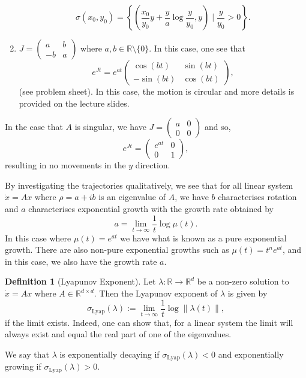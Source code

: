 \documentclass[
]{article}
\theoremstyle{definition}
\theoremstyle{definition}
\newtheorem{definition}{Definition}[section]
\begin{document}
\begin{enumerate}
  \[\sigma(x_0, y_0) = \left\{
    \left(\frac{x_0}{y_0}y + \frac{y}{a}\log\frac{y}{y_0}, y\right)
    \mid \frac{y}{y_0} > 0 \right\}.\]
\item
  \(J = \begin{pmatrix}  a & b \\ -b & a \end{pmatrix}\) where
  \(a, b \in \mathbb{R}\setminus\{0\}\). In this case, one see that
  \[e^{Jt} = e^{at}\begin{pmatrix}
    \cos(bt) & \sin(bt) \\ -\sin(bt) & \cos(bt)
  \end{pmatrix},\] (see problem sheet). In this case, the motion is
  circular and more details is provided on the lecture slides.
\end{enumerate}

In the case that \(A\) is singular, we have
\(J = \begin{pmatrix}  a & 0 \\ 0 & 0 \end{pmatrix}\) and so,
\[e^{Jt} = \begin{pmatrix}
  e^{at} & 0 \\ 0 & 1
\end{pmatrix},\] resulting in no movements in the \(y\) direction.

By investigating the trajectories qualitatively, we see that for all
linear system \(\dot x = A x\) where \(\rho = a + ib\) is an eigenvalue
of \(A\), we have \(b\) characterises rotation and \(a\) characterises
exponential growth with the growth rate obtained by
\[a = \lim_{t \to \infty} \frac{1}{t} \log \mu(t).\] In this case where
\(\mu(t) = e^{at}\) we have what is known as a pure exponential growth.
There are also non-pure exponential growths such as
\(\mu(t) = t^n e^{at}\), and in this case, we also have the growth rate
\(a\).

\begin{definition}[Lyapunov Exponent]
  Let \(\lambda : \mathbb{R} \to \mathbb{R}^d\) be a non-zero solution to 
  \(\dot x = A x\) where \(A \in \mathbb{R}^{d \times d}\). Then the Lyapunov 
  exponent of \(\lambda\) is given by 
  \[\sigma_\text{Lyap}(\lambda) := \lim_{t \to \infty} \frac{1}{t} \log \|\lambda(t)\|,\]
  if the limit exists. Indeed, one can show that, for a linear system the limit 
  will always exist and equal the real part of one of the eigenvalues.
\end{definition}

We say that \(\lambda\) is exponentially decaying if
\(\sigma_\text{Lyap}(\lambda) < 0\) and exponentially growing if
\(\sigma_\text{Lyap}(\lambda) > 0\).
\end{document}
